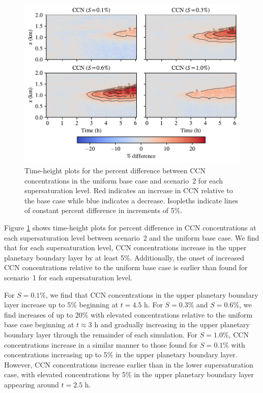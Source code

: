 \begin{figure}[!t]
  \centering
    \includegraphics[width=\textwidth]{figures/chapter5/height-time-ccn-pdiff-road-10x.pdf}
    \caption{Time-height plots for the percent difference between CCN concentrations in the uniform base case and scenario~2 for each supersaturation level. Red indicates an increase in CCN relative to the base case while blue indicates a decrease. Isopleths indicate lines of constant percent difference in increments of 5\%.}
    \label{fig:ht-ccn-pdiff-s2}
\end{figure}

Figure \ref{fig:ht-ccn-pdiff-s2} shows time-height plots for percent difference in CCN concentrations at each supersaturation level between scenario~2 and the uniform base case. We find that for each supersaturation level, CCN concentrations increase in the upper planetary boundary layer by at least 5\%. Additionally, the onset of increased CCN concentrations relative to the uniform base case is earlier than found for scenario~1 for each supersaturation level. 

For $S=0.1\%$, we find that CCN concentrations in the upper planetary boundary layer increase up to 5\% beginning at $t=4.5$ h. For $S=0.3\%$ and $S=0.6\%$, we find increases of up to 20\% with elevated concentrations relative to the uniform base case beginning at $t\approx3$ h and gradually increasing in the upper planetary boundary layer through the remainder of each simulation. For $S=1.0\%$, CCN concentrations increase in a similar manner to those found for $S=0.1\%$ with concentrations increasing up to 5\% in the upper planetary boundary layer. However, CCN concentrations increase earlier than in the lower supersaturation case, with elevated concentrations by 5\% in the upper planetary boundary layer appearing around $t=2.5$ h.

